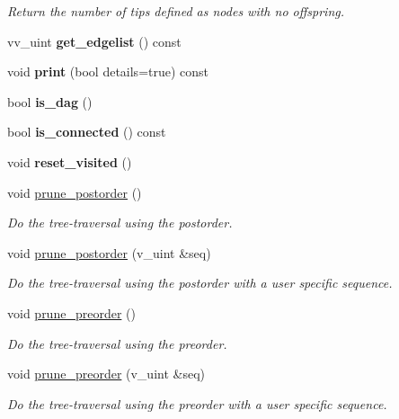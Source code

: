 \begin{DoxyCompactItemize}
\begin{DoxyCompactList}\small\item\em Return the number of tips defined as nodes with no offspring. \end{DoxyCompactList}\item 
vv\+\_\+uint {\bfseries get\+\_\+edgelist} () const \hypertarget{classTree_a700fd8abdcb805f53999b2fb00fc2710}{}\label{classTree_a700fd8abdcb805f53999b2fb00fc2710}

\item 
void {\bfseries print} (bool details=true) const \hypertarget{classTree_afe757ac173ac177a0ebefd222a06eed5}{}\label{classTree_afe757ac173ac177a0ebefd222a06eed5}

\item 
bool {\bfseries is\+\_\+dag} ()\hypertarget{classTree_af793b391043a88ceea805b584efb982a}{}\label{classTree_af793b391043a88ceea805b584efb982a}

\item 
bool {\bfseries is\+\_\+connected} () const \hypertarget{classTree_a9f911acd648bbae87eaa018e61289903}{}\label{classTree_a9f911acd648bbae87eaa018e61289903}

\item 
void {\bfseries reset\+\_\+visited} ()\hypertarget{classTree_adb83bb19c14623ce57ac6d1b84b1c2ff}{}\label{classTree_adb83bb19c14623ce57ac6d1b84b1c2ff}

\item 
void \hyperlink{classTree_a7d465880d18acf79f3a772ea5412b0d7}{prune\+\_\+postorder} ()
\begin{DoxyCompactList}\small\item\em Do the tree-\/traversal using the postorder. \end{DoxyCompactList}\item 
void \hyperlink{classTree_a8318027f3d2b1a07bf25e813c7c80056}{prune\+\_\+postorder} (v\+\_\+uint \&seq)
\begin{DoxyCompactList}\small\item\em Do the tree-\/traversal using the postorder with a user specific sequence. \end{DoxyCompactList}\item 
void \hyperlink{classTree_ac85bfb083b3856e65987e1d15885a61c}{prune\+\_\+preorder} ()
\begin{DoxyCompactList}\small\item\em Do the tree-\/traversal using the preorder. \end{DoxyCompactList}\item 
void \hyperlink{classTree_a6841109c7ff37bcabdf3a4d79009ad21}{prune\+\_\+preorder} (v\+\_\+uint \&seq)
\begin{DoxyCompactList}\small\item\em Do the tree-\/traversal using the preorder with a user specific sequence. \end{DoxyCompactList}\end{DoxyCompactItemize}
